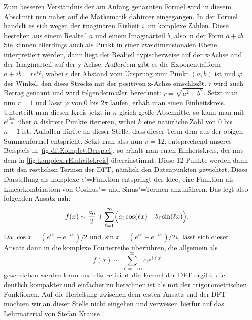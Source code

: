Zum besseren Verständnis der am Anfang genannten Formel wird in diesem Abschnitt nun näher auf die Mathematik dahinter eingegangen. In der Formel handelt es sich wegen der imaginären Einheit $i$ um komplexe Zahlen. Diese bestehen aus einem Realteil $a$ und einem Imaginärteil $b$, also in der Form $a + ib$. Sie können allerdings auch als Punkt in einer zweidimensionalen Ebene interpretiert werden, dann liegt der Realteil typischerweise auf der x-Achse und der Imaginärteil auf der y-Achse. Außerdem gibt es die Exponentialform $a+ib=re^{i\varphi}$, wobei $r$ der Abstand vom Ursprung zum Punkt $(a,b)$ ist und $\varphi$ der Winkel, den diese Strecke mit der positiven x-Achse einschließt. $r$ wird auch Betrag genannt und wird folgendermaßen berechnet: $r=\sqrt{a^2+b^2}$. Setzt man nun $r=1$ und lässt $\varphi$ von 0 bis $2\pi$ laufen, erhält man einen Einheitskreis. Unterteilt man diesen Kreis jetzt in $n$ gleich große Abschnitte, so kann man mit $e^{i\frac{2\pi k}{n}}$ über $n$ diskrete Punkte iterieren, wobei $k$ eine natürliche Zahl von 0 bis $n-1$ ist. Auffallen dürfte an dieser Stelle, dass dieser Term dem aus der obigen Summenformel entspricht. Setzt man also nun $n=12$, entsprechend unseres Beispiels in \autoref{fig:dftKomplettBeispiel}, so erhält man einen Einheitskreis, der mit dem in \autoref{fig:komplexerEinheitskreis} übereinstimmt. Diese 12 Punkte werden dann mit den restlichen Termen der \acs{DFT}, nämlich den Datenpunkten gewichtet. Diese Darstellung als komplexe $e$"=Funktion entspringt der Idee, eine Funktion als Linearkombination von Cosinus"= und Sinus"=Termen anzunähern. Das legt also folgenden Ansatz nah: \[f(x)\sim\frac{a_0}{2}+\sum_{\ell=1}^{\infty}\Bigl(a_\ell\cos(\ell x)+b_\ell\sin(\ell x)\Bigr).\] Da $\cos x = (e^{ix}+e^{-ix})/2 \text{ und } \sin x = (e^{ix}-e^{-ix})/2i$, lässt sich dieser Ansatz dann in die komplexe Fourierreihe überführen, die allgemein als \[f(x) \sim \sum_{\ell = -\infty}^\infty c_\ell e^{i\ell x}\] geschrieben werden kann und diskretisiert die Formel der \acs{DFT} ergibt, die deutlich kompakter und einfacher zu berechnen ist als mit den trigonometrischen Funktionen. Auf die Herleitung zwischen dem ersten Ansatz und der \acs{DFT} möchten wir an dieser Stelle nicht eingehen und verweisen hierfür auf das Lehrmaterial von Stefan Krause \cite{fourierundwavelet}.


